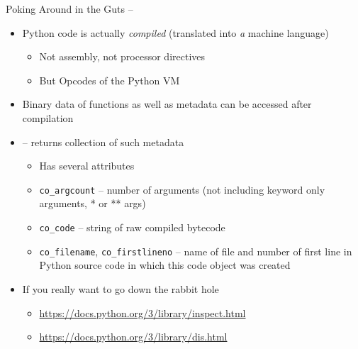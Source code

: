 
\begin{frame}[fragile]{Poking Around in the Guts -- }
%
\begin{itemize}
\item Python code is actually \emph{compiled} (\ie translated into \emph{a} machine language)
	\begin{itemize}
	\item Not assembly, not processor directives
	\item But Opcodes of the Python VM
	\end{itemize}
\item Binary data of functions as well as metadata can be accessed after compilation
\item[\Thus]  -- returns collection of such metadata
	\begin{itemize}
	\item Has several attributes
	\item \texttt{co\_argcount} -- number of arguments (not including keyword only arguments, * or ** args)
	\item \texttt{co\_code} -- string of raw compiled bytecode
	\item \texttt{co\_filename}, \texttt{co\_firstlineno} -- name of file and number of first line in Python source code in which this code object was created
	\end{itemize}
\item If you really want to go down the rabbit hole
	\begin{itemize}
	\item \url{https://docs.python.org/3/library/inspect.html}
	\item \url{https://docs.python.org/3/library/dis.html}
	\end{itemize}
\end{itemize}
%
\end{frame}



